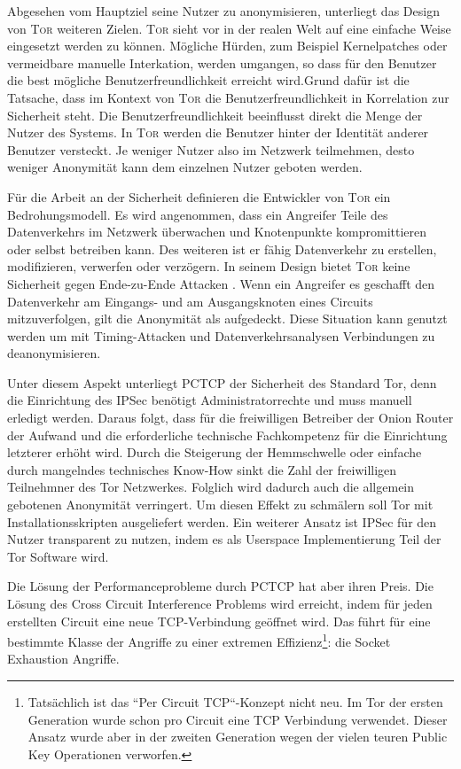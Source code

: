 \documentclass[fleqn,envcountsame,runningheads,10pt,a4paper]{llncs}
\begin{document}
Abgesehen vom Hauptziel seine Nutzer zu anonymisieren, unterliegt das Design von \textsc{Tor} weiteren Zielen. \textsc{Tor} sieht vor in der realen Welt auf eine einfache Weise eingesetzt werden zu können. Mögliche Hürden, zum Beispiel Kernelpatches oder vermeidbare manuelle Interkation, werden umgangen, so dass für den Benutzer die best mögliche Benutzerfreundlichkeit erreicht wird.Grund dafür ist die Tatsache, dass im Kontext von \textsc{Tor} die Benutzerfreundlichkeit in Korrelation zur Sicherheit steht. Die Benutzerfreundlichkeit beeinflusst direkt die Menge der Nutzer des Systems. In \textsc{Tor} werden die Benutzer hinter der Identität anderer Benutzer versteckt. Je weniger Nutzer also im Netzwerk teilmehmen, desto weniger Anonymität kann dem einzelnen Nutzer geboten werden.

Für die Arbeit an der Sicherheit definieren die Entwickler von \textsc{Tor} ein Bedrohungsmodell. Es wird angenommen, dass ein Angreifer Teile des Datenverkehrs im Netzwerk überwachen und Knotenpunkte kompromittieren oder selbst betreiben kann. Des weiteren ist er fähig Datenverkehr zu erstellen, modifizieren, verwerfen oder verzögern. In seinem Design bietet \textsc{Tor} keine Sicherheit gegen Ende-zu-Ende Attacken \cite{tor}. Wenn ein Angreifer es geschafft den Datenverkehr am Eingangs- und am Ausgangsknoten eines Circuits mitzuverfolgen, gilt die Anonymität als aufgedeckt. Diese Situation kann genutzt werden um mit Timing-Attacken und Datenverkehrsanalysen Verbindungen zu deanonymisieren.

\newpage Unter diesem Aspekt unterliegt PCTCP der Sicherheit des Standard Tor, denn die Einrichtung des IPSec benötigt Administratorrechte und muss manuell erledigt werden. Daraus folgt, dass für die freiwilligen Betreiber der Onion Router der Aufwand und die erforderliche technische Fachkompetenz für die Einrichtung letzterer erhöht wird. Durch die Steigerung der Hemmschwelle oder einfache durch mangelndes technisches Know-How sinkt die Zahl der freiwilligen Teilnehmner des Tor Netzwerkes. Folglich wird dadurch auch die allgemein gebotenen Anonymität verringert. Um diesen Effekt zu schmälern soll Tor mit Installationsskripten ausgeliefert werden. Ein weiterer Ansatz ist IPSec für den Nutzer transparent zu nutzen, indem es als Userspace Implementierung Teil der Tor Software wird.


Die Lösung der Performanceprobleme durch PCTCP hat aber ihren Preis. Die Lösung des Cross Circuit Interference Problems wird erreicht, indem für jeden erstellten Circuit eine neue TCP-Verbindung geöffnet wird. Das führt für eine bestimmte Klasse der Angriffe zu einer extremen Effizienz\footnote{Tatsächlich ist das ``Per Circuit TCP``-Konzept nicht neu. Im Tor der ersten Generation wurde schon pro Circuit eine TCP Verbindung verwendet. Dieser Ansatz wurde aber in der zweiten Generation wegen der vielen teuren Public Key Operationen verworfen.\cite{tor}}: die Socket Exhaustion Angriffe. 
\end{document}
